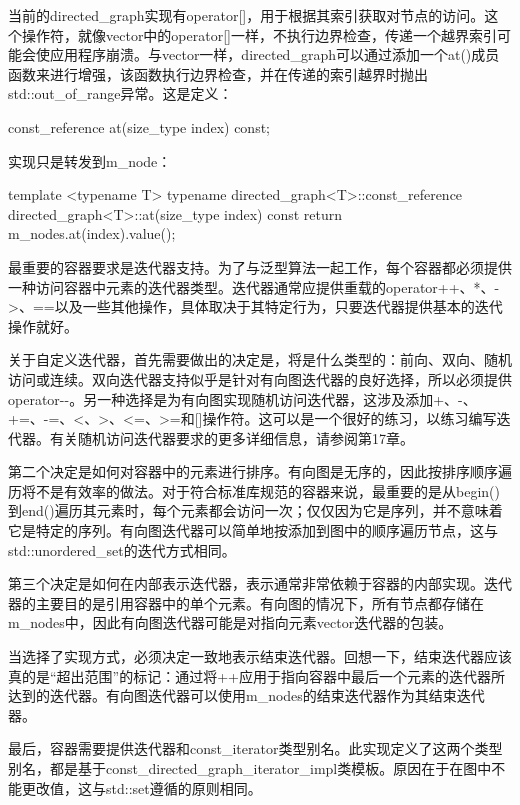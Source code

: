 当前的directed\_graph实现有operator[]，用于根据其索引获取对节点的访问。这个操作符，就像vector中的operator[]一样，不执行边界检查，传递一个越界索引可能会使应用程序崩溃。与vector一样，directed\_graph可以通过添加一个at()成员函数来进行增强，该函数执行边界检查，并在传递的索引越界时抛出std::out\_of\_range异常。这是定义：

\begin{cpp}
const_reference at(size_type index) const;
\end{cpp}

实现只是转发到m\_node：

\begin{cpp}
template <typename T>
typename directed_graph<T>::const_reference
    directed_graph<T>::at(size_type index) const
{
    return m_nodes.at(index).value();
}
\end{cpp}


最重要的容器要求是迭代器支持。为了与泛型算法一起工作，每个容器都必须提供一种访问容器中元素的迭代器类型。迭代器通常应提供重载的operator++、*、->、==以及一些其他操作，具体取决于其特定行为，只要迭代器提供基本的迭代操作就好。

关于自定义迭代器，首先需要做出的决定是，将是什么类型的：前向、双向、随机访问或连续。双向迭代器支持似乎是针对有向图迭代器的良好选择，所以必须提供operator-{}-。另一种选择是为有向图实现随机访问迭代器，这涉及添加+、-、+=、-=、<、>、<=、>=和[]操作符。这可以是一个很好的练习，以练习编写迭代器。有关随机访问迭代器要求的更多详细信息，请参阅第17章。

第二个决定是如何对容器中的元素进行排序。有向图是无序的，因此按排序顺序遍历将不是有效率的做法。对于符合标准库规范的容器来说，最重要的是从begin()到end()遍历其元素时，每个元素都会访问一次；仅仅因为它是序列，并不意味着它是特定的序列。有向图迭代器可以简单地按添加到图中的顺序遍历节点，这与std::unordered\_set的迭代方式相同。

第三个决定是如何在内部表示迭代器，表示通常非常依赖于容器的内部实现。迭代器的主要目的是引用容器中的单个元素。有向图的情况下，所有节点都存储在m\_nodes中，因此有向图迭代器可能是对指向元素vector迭代器的包装。

当选择了实现方式，必须决定一致地表示结束迭代器。回想一下，结束迭代器应该真的是“超出范围”的标记：通过将++应用于指向容器中最后一个元素的迭代器所达到的迭代器。有向图迭代器可以使用m\_nodes的结束迭代器作为其结束迭代器。

最后，容器需要提供迭代器和const\_iterator类型别名。此实现定义了这两个类型别名，都是基于const\_directed\_graph\_iterator\_impl类模板。原因在于在图中不能更改值，这与std::set遵循的原则相同。

